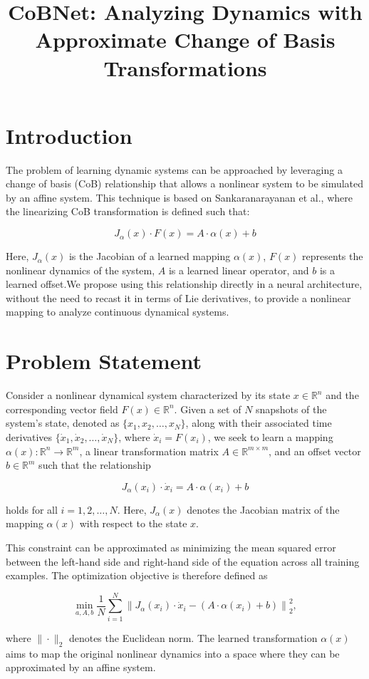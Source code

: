 \documentclass{article}
\title{CoBNet: Analyzing Dynamics with Approximate Change of Basis Transformations}
\author{}
\date{}
\begin{document}
\maketitle

\section{Introduction}

The problem of learning dynamic systems can be approached by leveraging a change of basis (CoB) relationship that allows a nonlinear system to be simulated by an affine system. This technique is based on Sankaranarayanan et al., where the linearizing CoB transformation is defined such that:

\[
J_\alpha(x) \cdot F(x) = A \cdot \alpha(x) + b
\]

Here, \( J_\alpha(x) \) is the Jacobian of a learned mapping \( \alpha(x) \), \( F(x) \) represents the nonlinear dynamics of the system, \( A \) is a learned linear operator, and \( b \) is a learned offset.We propose using this relationship directly in a neural architecture, without the need to recast it in terms of Lie derivatives, to provide a nonlinear mapping to analyze continuous dynamical systems.

\section{Problem Statement}

Consider a nonlinear dynamical system characterized by its state \( x \in \mathbb{R}^n \) and the corresponding vector field \( F(x) \in \mathbb{R}^n \). Given a set of \( N \) snapshots of the system's state, denoted as \( \{x_1, x_2, \dots, x_N\} \), along with their associated time derivatives \( \{\dot{x}_1, \dot{x}_2, \dots, \dot{x}_N\} \), where \( \dot{x}_i = F(x_i) \), we seek to learn a mapping \( \alpha(x): \mathbb{R}^n \rightarrow \mathbb{R}^m \), a linear transformation matrix \( A \in \mathbb{R}^{m \times m} \), and an offset vector \( b \in \mathbb{R}^m \) such that the relationship

\[
J_\alpha(x_i) \cdot \dot{x}_i = A \cdot \alpha(x_i) + b
\]

holds for all \( i = 1, 2, \dots, N \). Here, \( J_\alpha(x) \) denotes the Jacobian matrix of the mapping \( \alpha(x) \) with respect to the state \( x \).

This constraint can be approximated as minimizing the mean squared error between the left-hand side and right-hand side of the equation across all training examples. The optimization objective is therefore defined as

\[
\min_{a, A, b} \frac{1}{N} \sum_{i=1}^N \left\| J_\alpha(x_i) \cdot \dot{x}_i - \left( A \cdot \alpha(x_i) + b \right) \right\|_2^2,
\]

where \( \|\cdot\|_2 \) denotes the Euclidean norm. The learned transformation \( \alpha(x) \) aims to map the original nonlinear dynamics into a space where they can be approximated by an affine system.
\end{document}
